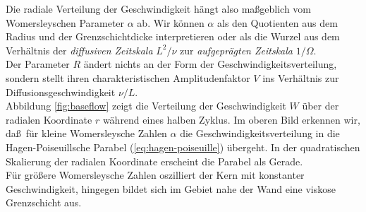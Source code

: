 \documentclass[10pt,a5paper,oneside,draft]{book}
\numberwithin{equation}{chapter}
\begin{document}
Die radiale Verteilung der Geschwindigkeit h\"angt also ma\ss geblich vom Womersleyschen Parameter $\alpha$ ab.
Wir k\"onnen $\alpha$ als den Quotienten aus dem Radius und der Grenzschichtdicke interpretieren oder als die Wurzel aus dem Verh\"altnis der \textit{diffusiven Zeitskala} $L^2/\nu$ zur \textit{aufgepr\"agten Zeitskala} $1/\Omega$.\\
Der Parameter $R$ \"andert nichts an der Form der Geschwindigkeitsverteilung, sondern stellt ihren charakteristischen Amplitudenfaktor $V$ ins Verh\"altnis zur Diffusionsgeschwindigkeit $\nu/L$.\\

Abbildung \mbox{\ref{fig:baseflow}} zeigt die Verteilung der Geschwindigkeit $W$ \"uber der radialen Koordinate $r$ w\"ahrend eines halben Zyklus.
Im oberen Bild erkennen wir, da\ss\ f\"ur kleine Womersleysche Zahlen $\alpha$ die Geschwindigkeitsverteilung in die Hagen-Poiseuillsche Parabel (\mbox{\ref{eq:hagen-poiseuille}}) \"ubergeht.
In der quadratischen Skalierung der radialen Koordinate erscheint die Parabel als Gerade.\\
F\"ur gr\"o\ss ere Womersleysche Zahlen oszilliert der Kern mit konstanter Geschwindigkeit, hingegen bildet sich im Gebiet nahe der Wand eine viskose Grenzschicht aus.\\
\end{document}

